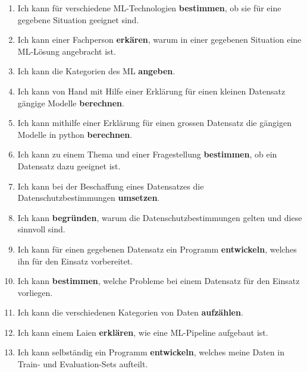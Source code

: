\documentclass[twocolumn]{article}
\begin{document}
\setcounter{mainnum}{1} %
\begin{enumerate}[label=\arabic{mainnum}.\arabic*, nosep]

    \item Ich kann für verschiedene ML-Technologien \textbf{bestimmen}, ob sie für eine gegebene Situation geeignet sind.
    \item Ich kann einer Fachperson \textbf{erkären}, warum in einer gegebenen Situation eine ML-Lösung angebracht ist.
    \item Ich kann die Kategorien des ML \textbf{angeben}.
    \item Ich kann von Hand mit Hilfe einer Erklärung für einen kleinen Datensatz gängige Modelle \textbf{berechnen}.
    \item Ich kann mithilfe einer Erklärung für einen grossen Datensatz die gängigen Modelle in python \textbf{berechnen}.


    \item Ich kann zu einem Thema und einer Fragestellung \textbf{bestimmen}, ob ein Datensatz dazu geeignet ist.
    \item Ich kann bei der Beschaffung eines Datensatzes die Datenschutzbestimmungen \textbf{umsetzen}.
    \item Ich kann \textbf{begründen}, warum die Datenschutzbestimmungen gelten und diese sinnvoll sind.


    \item Ich kann für einen gegebenen Datensatz ein Programm \textbf{entwickeln}, welches ihn für den Einsatz vorbereitet.
    \item Ich kann \textbf{bestimmen}, welche Probleme bei einem Datensatz für den Einsatz vorliegen. 
    \item Ich kann die verschiedenen Kategorien von Daten \textbf{aufzählen}.


    \item Ich kann einem Laien \textbf{erklären}, wie eine ML-Pipeline aufgebaut ist.
    \item Ich kann selbständig ein Programm \textbf{entwickeln}, welches meine Daten in Train- und Evaluation-Sets aufteilt.


\end{enumerate}
\end{document}
